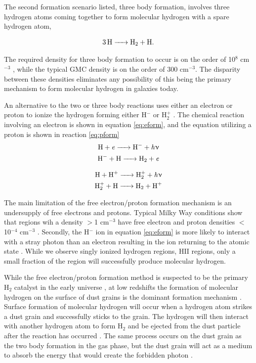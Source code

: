 The second formation scenario listed, three body formation, involves three hydrogen atoms coming together to form molecular hydrogen with a spare hydrogen atom,

\begin{equation}\label{eq:3bod}
  \ce{3H -> H_2 + H}.
\end{equation}

The required density for three body formation to occur is on the order of 10$^8$ cm$^{-3}$ \citep{palla1983,abel1997}, while the typical GMC density is on the order of 300 cm$^{-3}$.  The disparity between these densities eliminates any possibility of this being the primary mechanism to form molecular hydrogen in galaxies today. 

An alternative to the two or three body reactions uses either an electron or proton to ionize the hydrogen forming either H$^-$ or H$_2^+$ \citep{krumholz2014}.  The chemical reaction involving an electron is shown in equation \ref{eq:eform}, and the equation utilizing a proton is shown in reaction \ref{eq:pform}
\begin{equation}\label{eq:eform}
  \begin{split}
    \ce{H + \it{e} -> H^- + \it{h\nu}} \\
    \ce{H^- + H -> H_2 + \it{e}}
  \end{split}
\end{equation}

\begin{equation}\label{eq:pform}
  \begin{split}
    \ce{H + H^+ -> H^+_2 + \it{h\nu}} \\
    \ce{H^+_2 + H -> H_2 + H^+}
  \end{split}
\end{equation}

The main limitation of the free electron/proton formation mechanism is an undersupply of free electrons and protons.  Typical Milky Way conditions show that regions wih a density $>$1 cm$^{-3}$ have free electron and proton densities $<$10$^{-4}$ cm$^{-3}$ \citep{wolfire2003}.  Secondly, the H$^-$ ion in equation \ref{eq:eform} is more likely to interact with a stray photon than an electron resulting in the ion returning to the atomic state \citep{glover2003}.  While we observe singly ionized hydrogen regions, HII regions, only a small fraction of the region will successfully produce molecular hydrogen.

While the free electron/proton formation method is suspected to be the primary H$_2$ catalyst in the early universe \citep{herbst2005}, at low redshifts the formation of molecular hydrogen on the surface of dust grains is the dominant formation mechanism \citep{krumholz2014}.  Surface formation of molecular hydrogen will occur when a hydrogen atom strikes a dust grain and successfully sticks to the grain.  The hydrogen will then interact with another hydrogen atom to form H$_2$ and be ejected from the dust particle after the reaction has occurred \citep{pirronello1997}.  The same process occurs on the dust grain as the two body formation in the gas phase, but  the dust grain will act as a medium to absorb the energy that would create the forbidden photon \citep{krumholz2014}.

